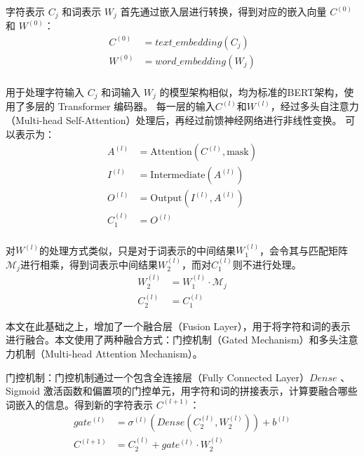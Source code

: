 \documentclass[12pt, a4paper]{ctexart}
\begin{document}
字符表示 $C_j$ 和词表示 $W_j$ 首先通过嵌入层进行转换，得到对应的嵌入向量 $C^{(0)}$ 和 $W^{(0)}$：
\begin{equation}
    \begin{split}
        C^{(0)} &= text\_embedding(C_j) \\
        W^{(0)} &= word\_embedding(W_j) \\
    \end{split}
\end{equation}

用于处理字符输入 $C_j$ 和词输入 $W_j$ 的模型架构相似，均为标准的BERT架构，使用了多层的 Transformer 编码器。
每一层的输入$C^{(l)}$和$W^{(l)}$，经过多头自注意力（Multi-head Self-Attention）处理后，再经过前馈神经网络进行非线性变换。
可以表示为：
\begin{equation}
    \begin{split}
        A^{(l)} &= \text{Attention}(C^{(l)}, \text{mask})\\
        I^{(l)} &= \text{Intermediate}(A^{(l)})\\
        O^{(l)} &= \text{Output}(I^{(l)}, A^{(l)})\\
        C^{(l)}_1 &= O^{(l)} \\
    \end{split}
\end{equation}

对$W^{(l)}$的处理方式类似，只是对于词表示的中间结果$W^{(l)}_1$，会令其与匹配矩阵${\mathcal{M}}_j$进行相乘，得到词表示中间结果$W^{(l)}_2$，而对$C^{(l)}_1$则不进行处理。
\begin{equation}
    \begin{split}
        W^{(l)}_2 &= W^{(l)}_1 \cdot {\mathcal{M}}_j \\
        C^{(l)}_2 &= C^{(l)}_1
    \end{split}
\end{equation}

本文在此基础之上，增加了一个融合层（Fusion Layer），用于将字符和词的表示进行融合。本文使用了两种融合方式：门控机制（Gated Mechanism）和多头注意力机制（Multi-head Attention Mechanism）。

\vspace{2em} %

门控机制：门控机制通过一个包含全连接层（Fully Connected Layer）$Dense$ 、Sigmoid 激活函数和偏置项的门控单元，用字符和词的拼接表示，计算要融合哪些词嵌入的信息。得到新的字符表示 $C^{(l+1)}$：
\begin{equation}
    \begin{split}
        gate^{(l)} &= {\sigma}^{(l)} (Dense(C^{(l)}_2, W^{(l)}_2) ) + b^{(l)} \\
        C^{(l+1)} &= C^{(l)}_2 + gate^{(l)} \cdot W^{(l)}_2 \\
    \end{split}
\end{equation}
\end{document}
